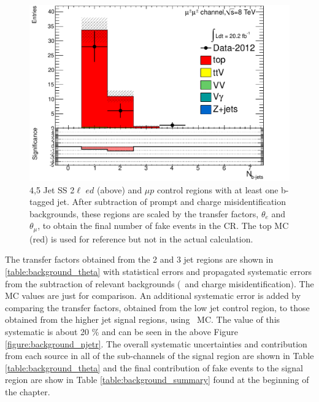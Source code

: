 \begin{figure}[htbp]
\begin{minipage}[h]{0.5\textwidth}
  \end{minipage}\hfill
  \begin{minipage}[h]{0.5\textwidth}
    \centering \includegraphics[width=\textwidth]{figs/fake/TaT-5jets-1b_nb_mm}
  \end{minipage}\hfill

  \caption{4,5 Jet SS 2$\ell$  $ed$ (above) and $\mu p$ control regions with at least one b-tagged jet. After subtraction of prompt and charge misidentification backgrounds, these regions
    are scaled by the transfer factors, $\theta_e$ and $\theta_{\mu}$, to obtain the final number of fake events in the CR. The top MC (red) is
  used for reference but not in the actual calculation.}
  \label{figure:background_45jets}
 \end{figure}

The transfer factors obtained from the 2 and 3 jet regions are shown in \ref{table:background_theta} with statistical errors and propagated systematic
errors from the subtraction of relevant backgrounds (\ttV\ and charge misidentification). The MC values are just for comparison. An additional 
systematic error is added by comparing the transfer factors, obtained from the low jet control region, to those obtained from the 
higher jet signal regions, using \ttbar\ MC. The value of this systematic is about 20 \% and can be seen in the above Figure \ref{figure:background_njetr}.
The overall systematic uncertainties and contribution from each source in all of the sub-channels of the signal region are shown in Table \ref{table:background_theta}
and the final contribution of fake events to the signal region are show in Table \ref{table:background_summary} found at the beginning of the chapter.  

